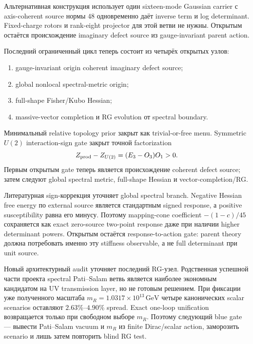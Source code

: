 Альтернативная конструкция использует один sixteen-mode Gaussian carrier с
axis-coherent source нормы $48$ одновременно даёт inverse term и log
determinant. Fixed-charge rotors и rank-eight projector для этой ветви не
нужны. Открытым остаётся происхождение imaginary defect source из
gauge-invariant parent action.

Последний ограниченный цикл теперь состоит из четырёх открытых узлов:
\begin{enumerate}
 \item gauge-invariant origin coherent imaginary defect source;
 \item global nonlocal spectral-metric origin;
 \item full-shape Fisher/Kubo Hessian;
 \item massive-vector completion и RG evolution от spectral boundary.
\end{enumerate}

Минимальный relative topology prior закрыт как trivial-or-free menu.
Symmetric \(U(2)\) interaction-sign gate закрыт точной factorization
\begin{equation}
 Z_{\rm prod}-Z_{U(2)}=(E_3-O_3)O_1>0.
\end{equation}
Первым открытым gate теперь является происхождение coherent defect source;
затем следуют global spectral metric, full-shape Hessian и
vector-completion/RG.

Литературная sign-коррекция уточняет global spectral branch. Negative Hessian
free energy по external source является стандартным signed response, а
positive susceptibility равна его минусу. Поэтому mapping-cone coefficient
\(-(1-c)/45\) сохраняется как exact zero-source two-point response даже при
наличии higher determinant powers. Открытым остаётся response-to-action gate:
parent theory должна потребовать именно эту stiffness observable, а не full
determinant при unit source.

Новый архитектурный audit уточняет последний RG-узел. Родственная успешной
части проекта spectral Pati--Salam ветвь является наиболее экономным
кандидатом на UV transmission layer, но не готовым решением. При фиксации
уже полученного масштаба \(m_R=1.0317\times10^{13}\,\mathrm{GeV}\) четыре
канонических scalar scenarios оставляют \(2.63\%\)--\(4.90\%\) spread.
Exact one-loop unification возвращается только при свободном выборе
\(m_R\). Поэтому следующий blue gate --- вывести Pati--Salam vacuum и
\(m_R\) из finite Dirac/scalar action, заморозить scenario и лишь затем
повторить blind RG test.

